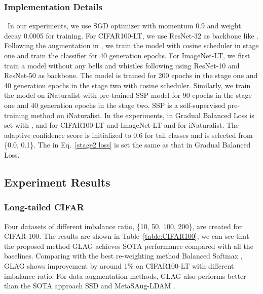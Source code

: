 \documentclass[runningheads]{llncs}
\begin{document}
\vspace{-5mm}

\subsubsection{Implementation Details}  \ In our experiments, we use SGD optimizer with momentum 0.9 and weight decay 0.0005 for training. For CIFAR100-LT, we use ResNet-32 as backbone like \cite{cao2019learning}. Following the augmentation in \cite{ren2020balanced}, we train the model with cosine scheduler in stage one and train the classifier for 40 generation epochs. For ImageNet-LT, we first train a model without any bells and whistles following \cite{kang2019decoupling} using ResNet-10 and ResNet-50 as backbone. The model is trained for 200 epochs in the stage one and 40 generation epochs in the stage two with cosine scheduler. Similarly, we train the model on iNaturalist with pre-trained SSP model \cite{yang2020rethinking} for 90 epochs in the stage one and 40 generation epochs in the stage two. SSP \cite{yang2020rethinking} is a self-supervised pre-training method on iNaturalist. In the experiments,  in Gradual Balanced Loss is set with , and  for CIFAR100-LT and ImageNet-LT and  for iNaturalist. The adaptive confidence score  is initialized to 0.6 for tail classes and  is selected from \{0.0, 0.1\}. The  in Eq.~\ref{stage2 loss} is set the same as that in Gradual Balanced Loss.

\subsection{Experiment Results}


\subsubsection{Long-tailed CIFAR} \; Four datasets of different imbalance ratio, \{10, 50, 100, 200\}, are created for CIFAR-100. The results are shown in Table~\ref{table:CIFAR100}, we can see that the proposed method GLAG achieves SOTA performance compared with all the baselines. Comparing with the best re-weighting method Balanced Softmax \cite{ren2020balanced}, GLAG shows improvement by around 1\% on CIFAR100-LT with different imbalance ratio.
For data augmentation methods, GLAG also performs better than the SOTA approach SSD \cite{li2021self} and MetaSAug-LDAM \cite{Li_2021_CVPR}. 

\vspace{-5mm}
\end{document}
